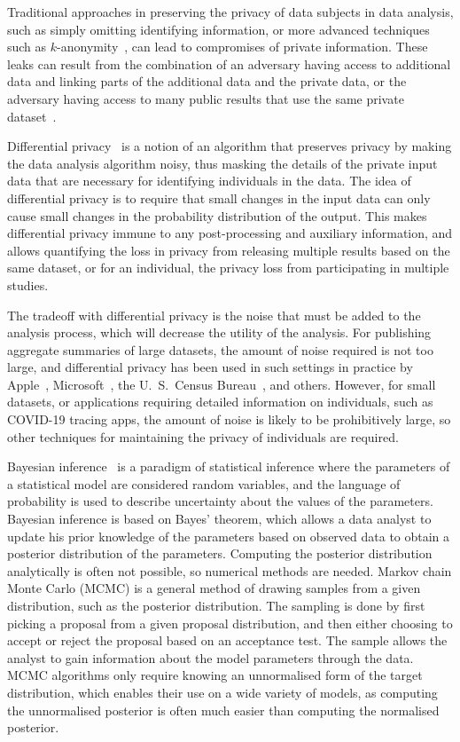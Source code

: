 \documentclass[english,twoside,openright]{HYgraduMLDS}
\begin{document}
Traditional approaches in preserving the privacy of data subjects in data
analysis, such as simply omitting identifying information, or
more advanced techniques such as \(k\)-anonymity~\cite{SaS98, Sam01},
can lead to compromises of private information. These leaks can result from
the combination of an
adversary having access to additional data and linking parts of the additional
data and the private data, or the adversary having access to many
public results that use the same private dataset~\cite{DiN03}.

Differential privacy~\cite{DMN06} is a notion of an algorithm that preserves
privacy by making the data analysis algorithm noisy, thus masking the details of
the private input data that are necessary for identifying individuals in the data.
The idea of differential privacy is to require that small changes in the input
data can only cause small changes in the probability distribution of the
output. This makes differential privacy immune to any post-processing and
auxiliary information, and allows quantifying the loss in privacy from releasing
multiple results based on the same dataset, or for an individual, the privacy
loss from participating in multiple studies.

The tradeoff with differential privacy is the noise that must be added to the
analysis process, which will decrease the utility of the analysis. For publishing
aggregate summaries of large datasets, the amount of noise required is not too
large, and differential privacy has been used in such settings in practice by
Apple~\cite{App17}, Microsoft~\cite{DKY17}, the U.\ S.\ Census Bureau~\cite{Abo18},
and others. However, for small datasets, or applications requiring detailed
information on individuals, such as COVID-19 tracing apps, the amount of
noise is likely to be prohibitively large, so other techniques for maintaining
the privacy of individuals are required.

Bayesian inference~\cite{BDA} is a paradigm of statistical inference where
the parameters of a statistical model are considered random variables, and
the language of probability is used to describe uncertainty about the values of the
parameters. Bayesian inference is based on Bayes' theorem, which allows
a data analyst to update his prior knowledge of the parameters based on observed
data to obtain a posterior distribution of the parameters.
Computing the posterior distribution analytically is often not possible,
so numerical methods are needed. Markov chain Monte Carlo (MCMC) is a general
method of drawing
samples from a given distribution, such as the posterior distribution.
The sampling is done by first picking a proposal from a given proposal distribution,
and then either choosing to accept or reject the proposal based on an acceptance
test. The sample allows
the analyst to gain information about the model parameters through the data.
MCMC algorithms only require knowing an unnormalised form of the target distribution,
which enables their use on a wide variety of models, as computing the unnormalised
posterior is often much easier than computing the normalised posterior.
\end{document}

